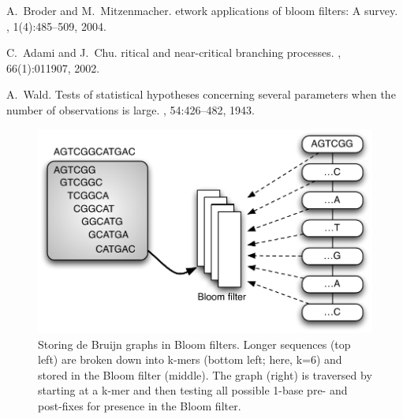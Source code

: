 \documentclass{pnastwo}
\begin{document}
\begin{article}
\begin{thebibliography}{10}
A.~Broder and M.~Mitzenmacher.
etwork applications of bloom filters: {A} survey.
, 1(4):485--509, 2004.

C.~Adami and J.~Chu.
ritical and near-critical branching processes.
, 66(1):011907, 2002.

A.~Wald.
\newblock Tests of statistical hypotheses concerning several parameters when
  the number of observations is large.
, 54:426--482,
  1943.

\end{thebibliography}

\end{article}

\begin{figure}
\centering
\includegraphics[width=5in]{bloomgraph}
\caption{Storing de Bruijn graphs in Bloom filters.  Longer sequences (top left) are broken down into k-mers (bottom left; here, k=6) and stored in the Bloom filter (middle).
The graph (right) is traversed by starting at a k-mer and then testing all possible 1-base pre- and post-fixes for presence in the Bloom filter.}

\label{fig:bloomgraph}
\end{figure}
\end{document}
